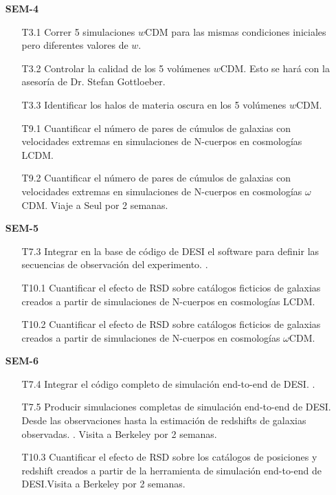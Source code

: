 \begin{itemize}
\item[\bf SEM-4]
\begin{itemize}
\item[T3.1] \gradA Correr 5 simulaciones $w$CDM para las mismas condiciones 
  iniciales pero diferentes valores de $w$. 
\item[T3.2] \gradA Controlar la calidad de los 5 vol\'umenes $w$CDM. Esto se
  har\'a con la asesor\'ia de Dr. Stefan Gottloeber. 
\item[T3.3] \gradA Identificar los halos de materia oscura en los 5 vol\'umenes $w$CDM. 
\item[T9.1] \gradB\prof Cuantificar el n\'umero de pares de c\'umulos de galaxias  con velocidades extremas en simulaciones de N-cuerpos en
  cosmolog\'ias LCDM. 
\item[T9.2] \gradB Cuantificar el n\'umero de pares de c\'umulos de galaxias con velocidades extremas en simulaciones de N-cuerpos en
  cosmolog\'ias $\omega$CDM. Viaje a Seul por 2 semanas.
\end{itemize}


\item[\bf SEM-5]
\begin{itemize}
\item[T7.3] \prof Integrar en la base de c\'odigo de DESI el software para
  definir las secuencias de observaci\'on del experimento. \bob.
\item[T10.1] \gradB
  Cuantificar el efecto de RSD sobre cat\'alogos ficticios de
  galaxias creados a partir de simulaciones de N-cuerpos en
  cosmolog\'ias LCDM. 
\item[T10.2] \gradB Cuantificar el efecto de RSD sobre cat\'alogos ficticios de
  galaxias creados a partir de simulaciones de N-cuerpos en
  cosmolog\'ias $\omega$CDM. 
\end{itemize}

\item[\bf SEM-6]
\begin{itemize}
\item[T7.4] \prof Integrar el c\'odigo completo de simulaci\'on end-to-end
  de DESI. \bob. 
\item[T7.5] \prof Producir simulaciones completas de simulaci\'on end-to-end
  de DESI. Desde las observaciones hasta la estimaci\'on de redshifts
  de galaxias observadas. \bob. Visita a Berkeley por 2 semanas.
\item[T10.3] \gradB Cuantificar el efecto de RSD sobre los cat\'alogos de
  posiciones y redshift creados a partir de la herramienta de
  simulaci\'on end-to-end de DESI.\bob Visita a Berkeley por 2 semanas.
\end{itemize}

\end{itemize}
